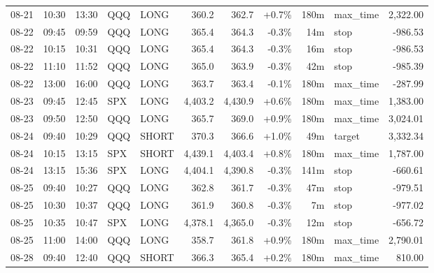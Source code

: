 \documentclass[11pt,a4paper,twoside]{article}
\begin{document}
\begin{center}
\begin{longtable}{>{\color{txtmain}}l l l l l r r r r >{\color{txtmain}}l r}
08-21 & 10:30 & 13:30 & QQQ & LONG & 360.2 & 362.7 & \textcolor{wingreen}{+0.7\%} & 180m & max\_time & \textcolor{wingreen}{2,322.00} \\
08-22 & 09:45 & 09:59 & QQQ & LONG & 365.4 & 364.3 & \textcolor{lossred}{-0.3\%} & 14m & stop & \textcolor{lossred}{-986.53} \\
08-22 & 10:15 & 10:31 & QQQ & LONG & 365.4 & 364.3 & \textcolor{lossred}{-0.3\%} & 16m & stop & \textcolor{lossred}{-986.53} \\
08-22 & 11:10 & 11:52 & QQQ & LONG & 365.0 & 363.9 & \textcolor{lossred}{-0.3\%} & 42m & stop & \textcolor{lossred}{-985.39} \\
08-22 & 13:00 & 16:00 & QQQ & LONG & 363.7 & 363.4 & \textcolor{lossred}{-0.1\%} & 180m & max\_time & \textcolor{lossred}{-287.99} \\
08-23 & 09:45 & 12:45 & SPX & LONG & 4,403.2 & 4,430.9 & \textcolor{wingreen}{+0.6\%} & 180m & max\_time & \textcolor{wingreen}{1,383.00} \\
08-23 & 09:50 & 12:50 & QQQ & LONG & 365.7 & 369.0 & \textcolor{wingreen}{+0.9\%} & 180m & max\_time & \textcolor{wingreen}{3,024.01} \\
08-24 & 09:40 & 10:29 & QQQ & SHORT & 370.3 & 366.6 & \textcolor{wingreen}{+1.0\%} & 49m & target & \textcolor{wingreen}{3,332.34} \\
08-24 & 10:15 & 13:15 & SPX & SHORT & 4,439.1 & 4,403.4 & \textcolor{wingreen}{+0.8\%} & 180m & max\_time & \textcolor{wingreen}{1,787.00} \\
08-24 & 13:15 & 15:36 & SPX & LONG & 4,404.1 & 4,390.8 & \textcolor{lossred}{-0.3\%} & 141m & stop & \textcolor{lossred}{-660.61} \\
08-25 & 09:40 & 10:27 & QQQ & LONG & 362.8 & 361.7 & \textcolor{lossred}{-0.3\%} & 47m & stop & \textcolor{lossred}{-979.51} \\
08-25 & 10:30 & 10:37 & QQQ & LONG & 361.9 & 360.8 & \textcolor{lossred}{-0.3\%} & 7m & stop & \textcolor{lossred}{-977.02} \\
08-25 & 10:35 & 10:47 & SPX & LONG & 4,378.1 & 4,365.0 & \textcolor{lossred}{-0.3\%} & 12m & stop & \textcolor{lossred}{-656.72} \\
08-25 & 11:00 & 14:00 & QQQ & LONG & 358.7 & 361.8 & \textcolor{wingreen}{+0.9\%} & 180m & max\_time & \textcolor{wingreen}{2,790.01} \\
08-28 & 09:40 & 12:40 & QQQ & SHORT & 366.3 & 365.4 & \textcolor{wingreen}{+0.2\%} & 180m & max\_time & \textcolor{wingreen}{810.00} \\

\end{longtable}
\end{center}
\end{document}
